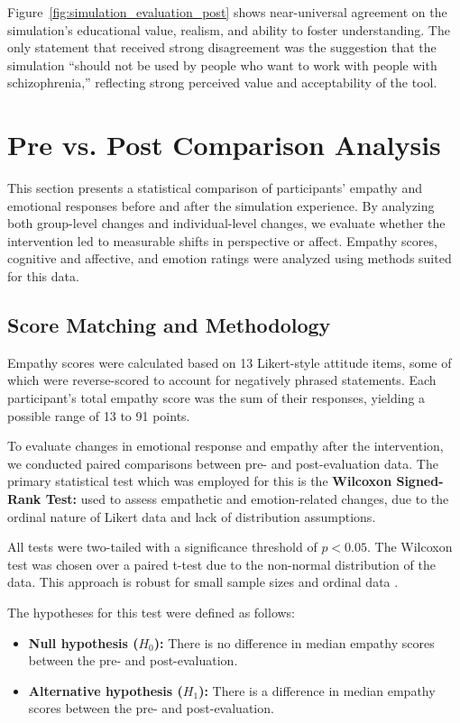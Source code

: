 Figure~\ref{fig:simulation_evaluation_post} shows near-universal agreement on the simulation’s educational value, realism, and ability to foster understanding. The only statement that received strong disagreement was the suggestion that the simulation “should not be used by people who want to work with people with schizophrenia,” reflecting strong perceived value and acceptability of the tool.

\section{Pre vs. Post Comparison Analysis}
This section presents a statistical comparison of participants’ empathy and emotional responses before and after the simulation experience. By analyzing both group-level changes and individual-level changes, we evaluate whether the intervention led to measurable shifts in perspective or affect. Empathy scores, cognitive and affective, and emotion ratings were analyzed using methods suited for this data.

\subsection{Score Matching and Methodology}

Empathy scores were calculated based on 13 Likert-style attitude items, some of which were reverse-scored to account for negatively phrased statements. Each participant's total empathy score was the sum of their responses, yielding a possible range of 13 to 91 points.

To evaluate changes in emotional response and empathy after the intervention, we conducted paired comparisons between pre- and post-evaluation data. The primary statistical test which was employed for this is the \textbf{Wilcoxon Signed-Rank Test:} used to assess empathetic and emotion-related changes, due to the ordinal nature of Likert data and lack of distribution assumptions.

All tests were two-tailed with a significance threshold of $p < 0.05$. The Wilcoxon test was chosen over a paired t-test due to the non-normal distribution of the data. This approach is robust for small sample sizes and ordinal data \cite{Wilcoxon2013}.

The hypotheses for this test were defined as follows:

\begin{itemize}
  \item \textbf{Null hypothesis ($H_0$):} There is no difference in median empathy scores between the pre- and post-evaluation.
  \item \textbf{Alternative hypothesis ($H_1$):} There is a difference in median empathy scores between the pre- and post-evaluation.
\end{itemize}


